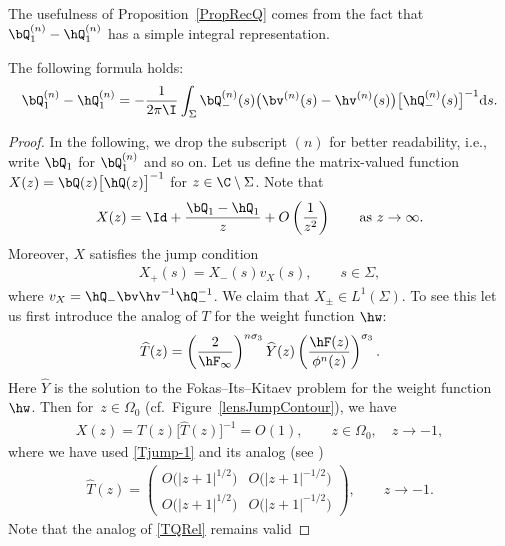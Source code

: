The usefulness of Proposition~\ref{PropRecQ} comes from the fact that $\bQ^{(n)}_1- \hQ^{(n)}_1$ has a simple integral representation.
\begin{Proposition}[{\cite[Proposition~4.9]{CD}}]
The following formula holds:
\begin{align}\label{QIntForm}
 \bQ^{(n)}_1- \hQ^{(n)}_1 = -\frac{1}{2\pi\I}\int_\Sigma \bQ^{(n)}_-(s)\big(\bv^{(n)}(s)-\hv^{(n)}(s)\big)\big[\hQ^{(n)}_-(s)\big]^{-1} {\rm d}s.
\end{align}
\end{Proposition}
\begin{proof}
In the following, we drop the subscript $(n)$ for better readability, i.e., write $\bQ_1$ for $\bQ^{(n)}_1$ and so on. Let us define the matrix-valued function $X(z) = \bQ(z) \big[\hQ(z)\big]^{-1}$ for $z \in \C \setminus \Sigma$. Note that
\begin{align}\label{Rformula}
 X(z) = \Id + \frac{\bQ_1-\hQ_1}{z} + O\left(\frac{1}{z^2}\right) \qquad \text{as } z \to \infty.
\end{align}
Moreover, $X$ satisfies the jump condition
\begin{align*}
 X_+(s) = X_-(s)v_X(s), \qquad s\in \Sigma,
\end{align*}
where $v_X = \hQ_- \bv \hv^{-1} \hQ_-^{-1}$. We claim that $X_\pm \in L^1(\Sigma)$. To see this let us first introduce the analog of $T$ for the weight function $\hw$:
\begin{align*}
 \widehat T(z) = \left(\frac{2}{\hF_\infty}\right)^{n\sigma_3} \widehat Y(z) \left(\frac{\hF(z)}{\phi^n(z)}\right)^{\sigma_3}.
\end{align*}
Here $\hat Y$ is the solution to the Fokas--Its--Kitaev problem for the weight function $\hw$. Then for~${z \in \Omega_0}$ (cf.\ Figure~\ref{lensJumpContour}), we have
\begin{align*}%
 X(z) = T(z)\big[\widehat T(z)\big]^{-1} = O(1), \qquad z\in \Omega_0, \quad z\to-1,
\end{align*}
where we have used \eqref{Tjump-1} and its analog (see \cite[Section~2]{KMVV})
\begin{align}\label{hTjump-1}
 \widehat T(z) = \begin{pmatrix}
 O\big(|z+1|^{1/2}\big) & O\big(|z+1|^{-1/2}\big)
 \\
 O\big(|z+1|^{1/2}\big) & O\big(|z+1|^{-1/2}\big)
 \end{pmatrix}, \qquad z \to -1.
\end{align}
Note that the analog of \eqref{TQRel} remains valid

\end{proof}
